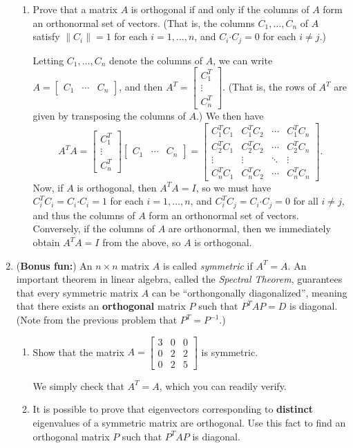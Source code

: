 \documentclass[12pt]{article}
\newcommand{\len}[1]{\lVert #1\rVert}
\newcommand{\dotp}{\boldsymbol{\cdot}}
\newcommand{\bbm}{\begin{bmatrix}}
\newcommand{\ebm}{\end{bmatrix}}
\begin{document}
\begin{enumerate}
\begin{enumerate}
 \item Prove that a matrix $A$ is orthogonal if and only if the columns of $A$ form an orthonormal set of vectors. (That is, the columns $C_1,\ldots, C_n$ of $A$ satisfy $\len{C_i}=1$ for each $i=1,\ldots, n$, and $C_i\dotp C_j = 0$ for each $i\neq j$.) 

\bigskip

Letting $C_1, \ldots, C_n$ denote the columns of $A$, we can write $A = \bbm C_1&\cdots & C_n\ebm$, and then $A^T = \bbm C_1^T\\\vdots \\C_n^T\ebm$. (That is, the rows of $A^T$ are given by transposing the columns of $A$.) We then have
\[
 A^TA = \bbm C_1^T\\\vdots \\C_n^T\ebm\bbm C_1&\cdots & C_n\ebm = \bbm C_1^TC_1 & C_1^TC_2 & \cdots & C_1^TC_n\\C_2^TC_1 & C_2^TC_2 & \cdots & C_2^TC_n\\\vdots & \vdots & \ddots & \vdots \\C_n^TC_1 & C_n^TC_2 & \cdots & C_n^TC_n\ebm.
\]
Now, if $A$ is orthogonal, then $A^TA = I$, so we must have $C_i^TC_i = C_i\dotp C_i = 1$ for each $i=1,\ldots, n$, and $C_i^TC_j = C_i\dotp C_j = 0$ for all $i\neq j$, and thus the columns of $A$ form an orthonormal set of vectors. Conversely, if the columns of $A$ are orthonormal, then we immediately obtain $A^TA=I$ from the above, so $A$ is orthogonal.

\end{enumerate}

\item (\textbf{Bonus fun:}) An $n\times n$ matrix $A$ is called \textit{symmetric} if $A^T=A$. An important theorem in linear algebra, called the \textit{Spectral Theorem}, guarantees that every symmetric matrix $A$ can be ``orthongonally diagonalized'', meaning that there exists an \textbf{orthogonal} matrix $P$ such that $P^TAP = D$ is diagonal. (Note from the previous problem that $P^T=P^{-1}$.)
\begin{enumerate}
 \item Show that the matrix $A = \bbm 3&0&0\\0&2&2\\0&2&5\ebm$ is symmetric.

\bigskip

We simply check that $A^T=A$, which you can readily verify.

 \item It is possible to prove that eigenvectors corresponding to \textbf{distinct} eigenvalues of a symmetric matrix are orthogonal. Use this fact to find an orthogonal matrix $P$ such that $P^TAP$ is diagonal.


\end{enumerate}
\end{enumerate}
\end{document}
